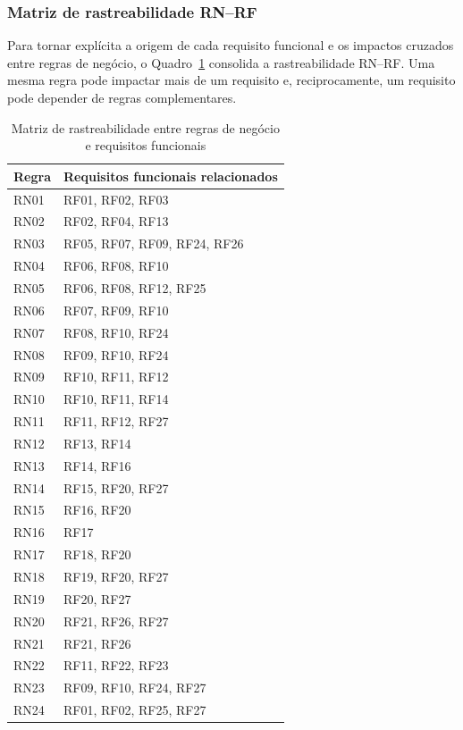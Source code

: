 \subsubsection{Matriz de rastreabilidade RN--RF}

Para tornar explícita a origem de cada requisito funcional e os impactos cruzados entre regras de negócio, o Quadro~\ref{tab_rastreabilidade} consolida a rastreabilidade RN--RF. Uma mesma regra pode impactar mais de um requisito e, reciprocamente, um requisito pode depender de regras complementares.

\begin{table}[H]
\caption{Matriz de rastreabilidade entre regras de negócio e requisitos funcionais}
\label{tab_rastreabilidade}
\centering
\scriptsize
\begin{tabular}{p{2cm}p{11.5cm}}
\hline
\textbf{Regra} & \textbf{Requisitos funcionais relacionados} \\
\hline
RN01 & RF01, RF02, RF03 \\
RN02 & RF02, RF04, RF13 \\
RN03 & RF05, RF07, RF09, RF24, RF26 \\
RN04 & RF06, RF08, RF10 \\
RN05 & RF06, RF08, RF12, RF25 \\
RN06 & RF07, RF09, RF10 \\
RN07 & RF08, RF10, RF24 \\
RN08 & RF09, RF10, RF24 \\
RN09 & RF10, RF11, RF12 \\
RN10 & RF10, RF11, RF14 \\
RN11 & RF11, RF12, RF27 \\
RN12 & RF13, RF14 \\
RN13 & RF14, RF16 \\
RN14 & RF15, RF20, RF27 \\
RN15 & RF16, RF20 \\
RN16 & RF17 \\
RN17 & RF18, RF20 \\
RN18 & RF19, RF20, RF27 \\
RN19 & RF20, RF27 \\
RN20 & RF21, RF26, RF27 \\
RN21 & RF21, RF26 \\
RN22 & RF11, RF22, RF23 \\
RN23 & RF09, RF10, RF24, RF27 \\
RN24 & RF01, RF02, RF25, RF27 \\
\hline
\end{tabular}
\end{table}

